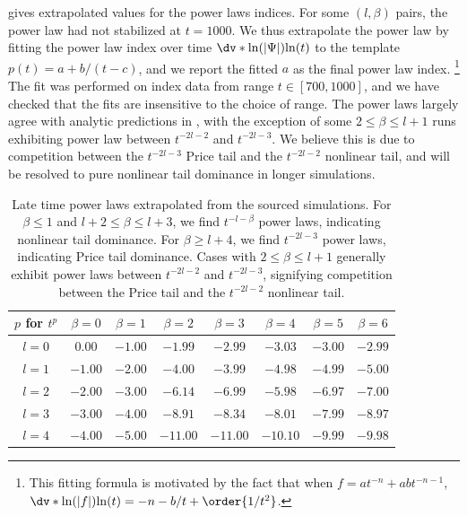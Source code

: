  gives extrapolated values for the power laws indices.
For some $(l,\beta)$ pairs, the power law had not stabilized at $t=1000$.
We thus extrapolate the power law by fitting the power law index over time $\dv*{\ln(|\Psi|)}{\ln(t)}$ to the template $p(t) = a + b / (t - c)$, and we report the fitted $a$ as the final power law index.
\footnote{This fitting formula is motivated by the fact that when $f = a t^{-n} + ab t^{-n-1}$, $\dv*{\ln(|f|)}{\ln(t)} = -n - b / t + \order{1/t^2}$.}
The fit was performed on index data from range $t \in [700,1000]$, and we have checked that the fits are insensitive to the choice of range.
The power laws largely agree with analytic predictions in , with the exception of some $2 \leq \beta \leq l+1$ runs exhibiting power law between $t^{-2l-2}$ and $t^{-2l-3}$.
We believe this is due to competition between the $t^{-2l-3}$ Price tail and the $t^{-2l-2}$ nonlinear tail, and will be resolved to pure nonlinear tail dominance in longer simulations.
\begin{table}[t]
  \centering
  \begin{tabular}{|c|c|c|c|c|c|c|c|}
    \hline
    $p$ for $t^{p}$ & $\beta=0$ & $\beta=1$ & $\beta=2$ & $\beta=3$ & $\beta=4$ & $\beta=5$ & $\beta=6$ \\
    \hline
    $l=0$&$0.00$&$-1.00$&$-1.99$&$-2.99$&$-3.03$&$-3.00$&$-2.99$\\$l=1$&$-1.00$&$-2.00$&$-4.00$&$-3.99$&$-4.98$&$-4.99$&$-5.00$\\$l=2$&$-2.00$&$-3.00$&$-6.14$&$-6.99$&$-5.98$&$-6.97$&$-7.00$\\$l=3$&$-3.00$&$-4.00$&$-8.91$&$-8.34$&$-8.01$&$-7.99$&$-8.97$\\$l=4$&$-4.00$&$-5.00$&$-11.00$&$-11.00$&$-10.10$&$-9.99$&$-9.98$ \\
    \hline
  \end{tabular}
  \caption{Late time power laws extrapolated from the sourced simulations.
For $\beta \leq 1$ and $l + 2 \leq \beta \leq l+3$, we find $t^{-l-\beta}$ power laws, indicating nonlinear tail dominance.
    For $\beta \geq l+4$, we find $t^{-2l-3}$ power laws, indicating Price tail dominance.
    Cases with $2 \leq \beta \leq l+1$ generally exhibit power laws between $t^{-2l-2}$ and $t^{-2l-3}$, signifying competition between the Price tail and the $t^{-2l-2}$ nonlinear tail.
  }
  \label{tab:nonlinear_tail_power_laws}
\end{table}


